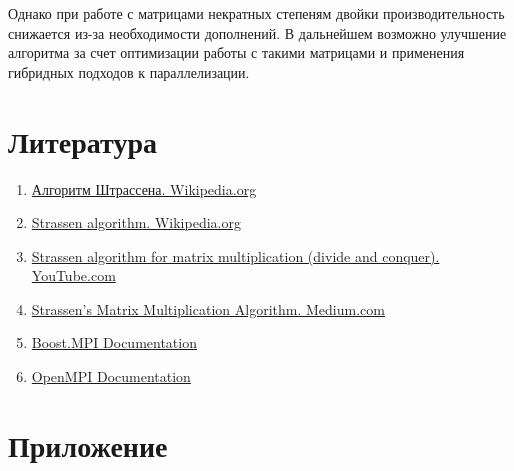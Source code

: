 \documentclass[a4paper, 14pt]{extarticle}
\begin{document}
Однако при работе с матрицами некратных степеням двойки производительность снижается из-за необходимости дополнений. В дальнейшем возможно улучшение алгоритма за счет оптимизации работы с такими матрицами и применения гибридных подходов к параллелизации.

    \newpage
    \section{Литература}
\begin{enumerate}
    \item \href{https://ru.wikipedia.org/wiki/%D0%90%D0%BB%D0%B3%D0%BE%D1%80%D0%B8%D1%82%D0%BC_%D0%A8%D1%82%D1%80%D0%B0%D1%81%D1%81%D0%B5%D0%BD%D0%B0}{Алгоритм Штрассена. Wikipedia.org}
    \item \href{https://en.wikipedia.org/wiki/Strassen_algorithm}{Strassen algorithm. Wikipedia.org}
    \item \href{https://youtu.be/OSelhO6Qnlc?si=hPwljRSC7fxsv0gp}{Strassen algorithm for matrix multiplication (divide and conquer). YouTube.com}
    \item \href{https://medium.com/swlh/strassens-matrix-multiplication-algorithm-936f42c2b344}{Strassen’s Matrix Multiplication Algorithm. Medium.com}
    \item \href{https://www.boost.org/doc/libs/1_87_0/doc/html/mpi.html}{Boost.MPI Documentation}
    \item \href{https://www.open-mpi.org/doc/}{OpenMPI Documentation}
\end{enumerate}

    \newpage
    \section{Приложение}
\end{document}
